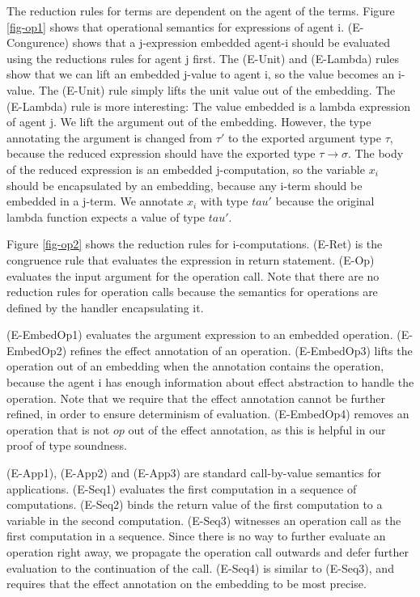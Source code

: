 The reduction rules for terms are dependent on the agent of the terms. Figure \ref{fig-op1} shows that operational semantics for expressions of agent i. (E-Congurence) shows that a j-expression embedded agent-i should be evaluated using the reductions rules for agent j first. The (E-Unit) and (E-Lambda) rules show that we can lift an embedded j-value to agent i, so the value becomes an i-value. The (E-Unit) rule simply lifts the unit value out of the embedding. The (E-Lambda) rule is more interesting: The value embedded is a lambda expression of agent j. We lift the argument out of the embedding. However, the type annotating the argument is changed from $\tau'$ to the exported argument type $\tau$, because the reduced expression should have the exported type $\tau \rightarrow \sigma$. The body of the reduced expression is an embedded j-computation, so the variable $x_i$ should be encapsulated by an embedding, because any i-term should be embedded in a j-term. We annotate $x_i$ with type $tau'$ because the original lambda function expects a value of type $tau'$. 

Figure \ref{fig-op2} shows the reduction rules for i-computations. (E-Ret) is the congruence rule that evaluates the expression in return statement. (E-Op) evaluates the input argument for the operation call. Note that there are no reduction rules for operation calls because the semantics for operations are defined by the handler encapsulating it. 

(E-EmbedOp1) evaluates the argument expression to an embedded operation. (E-EmbedOp2) refines the effect annotation of an operation. (E-EmbedOp3) lifts the operation out of an embedding when the annotation contains the operation, because the agent i has enough information about effect abstraction to handle the operation. Note that we require that the effect annotation cannot be further refined, in order to ensure determinism of evaluation. (E-EmbedOp4) removes an operation that is not $op$ out of the effect annotation, as this is helpful in our proof of type soundness.

(E-App1), (E-App2) and (E-App3) are standard call-by-value semantics for applications. (E-Seq1) evaluates the first computation in a sequence of computations. (E-Seq2) binds the return value of the first computation to a variable in the second computation. (E-Seq3) witnesses an operation call as the first computation in a sequence. Since there is no way to further evaluate an operation right away, we propagate the operation call outwards and defer further evaluation to the continuation of the call. (E-Seq4) is similar to (E-Seq3), and requires that the effect annotation on the embedding to be most precise. 

